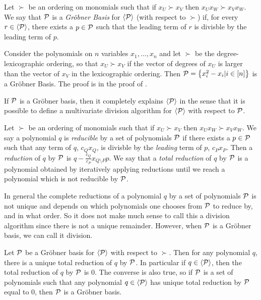 \begin{definition}\label{def:grobner}
Let $\succ$ be an ordering on monomials such that if $x_U \succ x_V$ then $x_Ux_W \succ x_Vx_W$. We say that $\mathcal P$ is a \emph{Gr\"obner Basis} for $\langle \mathcal P \rangle$ (with respect to $\succ$) if, for every $r \in \langle \mathcal P \rangle$, there exists a $p \in \mathcal P$ such that the leading term of $r$ is divisble by the leading term of $p$.
\end{definition}
\begin{example}\label{ex:grobner}
Consider the polynomials on $n$ variables $x_1,\dots,x_n$ and let $\succ$ be the degree-lexicographic ordering, so that $x_U \succ x_V$ if the vector of degrees of $x_U$ is larger than the vector of $x_V$ in the lexicographic ordering. Then $\mathcal P = \left\{x_i^2 - x_i | i \in [n]\right\}$ is a Gr\"obner Basis. The proof is in the proof of .
\end{example}
If $\mathcal P$ is a Gr\"obner basis, then it completely explains $\langle \mathcal P \rangle$ in the sense that it is possible to define a multivariate division algorithm for $\langle \mathcal P \rangle$ with respect to $\mathcal P$. 
\begin{definition}
Let $\succ$ be an ordering of monomials such that if $x_U \succ x_V$ then $x_Ux_W \succ x_Vx_W$. We say a polynomial $q$ is \emph{reducible} by a set of polynomials $\mathcal P$ if there exists a $p \in \mathcal P$ such that any term of $q$, $c_Qx_Q$, is divisble by the \emph{leading} term of $p$, $c_Px_P$. Then a \emph{reduction} of $q$ by $\mathcal P$ is $q - \frac{c_Q}{c_P}x_{Q \setminus P}p$. We say that a \emph{total reduction} of $q$ by $\mathcal P$ is a polynomial obtained by iteratively applying reductions until we reach a polynomial which is not reducible by $\mathcal P$. 
\end{definition}
In general the complete reductions of a polynomial $q$ by a set of polynomials $\mathcal P$ is not unique and depends on which polynomials one chooses from $\mathcal P$ to reduce by, and in what order. So it does not make much sense to call this a division algorithm since there is not a unique remainder. However, when $\mathcal P$ is a Gr\"obner basis, we can call it division.
\begin{proposition}\label{prop:grobner-unique}
Let $\mathcal P$ be a Gr\"obner basis for $\langle \mathcal P \rangle$ with respect to $\succ$. Then for any polynomial $q$, there is a unique total reduction of $q$ by $\mathcal P$. In particular if $q \in \langle \mathcal P \rangle$, then the total reduction of $q$ by $\mathcal P$ is $0$. The converse is also true, so if $\mathcal P$ is a set of polynomials such that any polynomial $q \in \langle \mathcal P \rangle$ has unique total reduction by $\mathcal P$ equal to $0$, then $\mathcal P$ is a Gr\"obner basis. 
\end{proposition}

